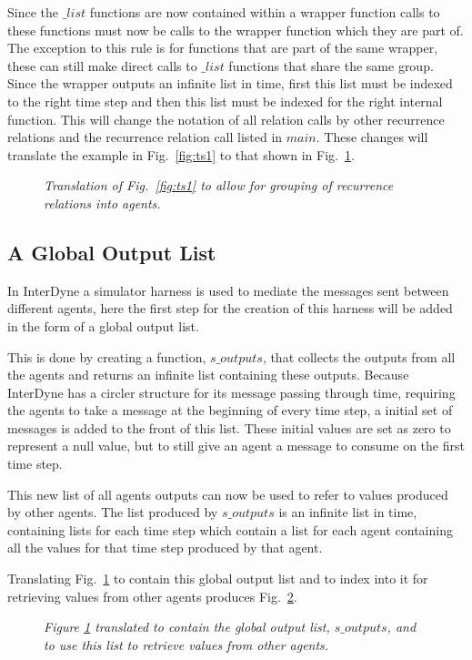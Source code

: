 \documentclass{article}
\begin{document}
Since the $\_list$ functions are now contained within a wrapper function calls to these functions must now be calls to the wrapper function which they are part of. The exception to this rule is for functions that are part of the same wrapper, these can still make direct calls to $\_list$ functions that share the same group. Since the wrapper outputs an infinite list in time, first this list must be indexed to the right time step and then this list must be indexed for the right internal function. This will change the notation of all relation calls by other recurrence relations and the recurrence relation call listed in $main$. These changes will translate the example in Fig.~\ref{fig:ts1} to that shown in Fig.~\ref{fig:ts2}.
\begin{figure}[H]
	\centering
	
	\caption{\it Translation of Fig.~\ref{fig:ts1} to allow for grouping of recurrence relations into agents.}
	\label{fig:ts2}
\end{figure} 



\subsection{A Global Output List}
In InterDyne a simulator harness is used to mediate the messages sent between different agents, here the first step for the creation of this harness will be added in the form of a global output list. 

This is done by creating a function, $s\_outputs$, that collects the outputs from all the agents and returns an infinite list containing these outputs. Because InterDyne has a circler structure for its message passing through time, requiring the agents to take a message at the beginning of every time step, a initial set of messages is added to the front of this list. These initial values are set as zero to represent a null value, but to still give an agent a message to consume on the first time step. 

This new list of all agents outputs can now be used to refer to values produced by other agents. The list produced by $s\_outputs$ is an infinite list in time,  containing lists for each time step which contain a list for each agent containing all the values for that time step produced by that agent. 

Translating Fig.~\ref{fig:ts2} to contain this global output list and to index into it for retrieving values from other agents produces Fig.~\ref{fig:ts3}.
\begin{figure}[H]
	\centering
	
	\caption{\it  Figure \ref{fig:ts2} translated to contain the global output list, $s\_outputs$, and to use this list to retrieve values from other agents.}
	\label{fig:ts3}
\end{figure} 
\end{document}
